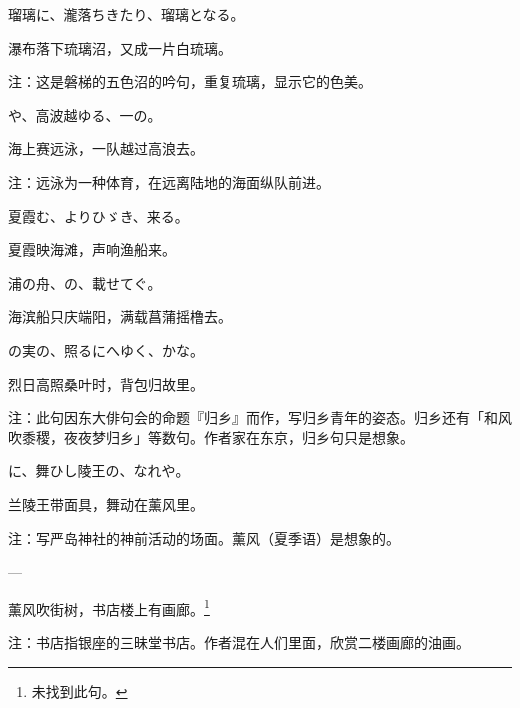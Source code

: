\begin{haiku}
    {\FH 瑠璃に、瀧落ちきたり、瑠璃となる。}

    {\FK 瀑布落下琉璃沼，又成一片白琉璃。}

    {\FT 注：这是磐梯的五色沼的吟句，重复琉璃，显示它的色美。}
\end{haiku}

\begin{haiku}
    {\FH {}や、高波越ゆる、一の。}

    {\FK 海上赛远泳，一队越过高浪去。}

    {\FT 注：远泳为一种体育，在远离陆地的海面纵队前进。}
\end{haiku}

\begin{haiku}
    {\FH 夏霞む、よりひゞき、来る。}

    {\FK 夏霞映海滩，声响渔船来。}
\end{haiku}

\begin{haiku}
    {\FH 浦の舟、の、載せてぐ。}

    {\FK 海滨船只庆端阳，满载菖蒲摇橹去。}
\end{haiku}

\begin{haiku}
    {\FH {}の実の、照るにへゆく、かな。}

    {\FK 烈日高照桑叶时，背包归故里。}

    {\FT 注：此句因东大俳句会的命题『归乡』而作，写归乡青年的姿态。归乡还有「和风吹黍稷，夜夜梦归乡」等数句。作者家在东京，归乡句只是想象。}
\end{haiku}

\begin{haiku}
    {\FH {}に、舞ひし陵王の、なれや。}

    {\FK 兰陵王带面具，舞动在薰风里。}

    {\FT 注：写严岛神社的神前活动的场面。薰风（夏季语）是想象的。}
\end{haiku}

\begin{haiku}
    {\FH ---}

    {\FK 薰风吹街树，书店楼上有画廊。\footnote{\FT 未找到此句。}}

    {\FT 注：书店指银座的三昧堂书店。作者混在人们里面，欣赏二楼画廊的油画。}
\end{haiku}

